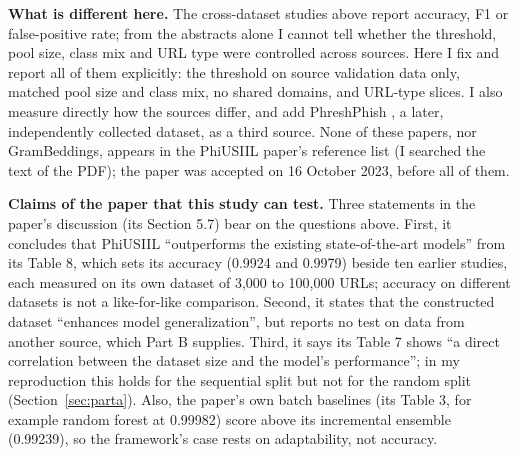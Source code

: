 \documentclass[10pt]{article}
\begin{document}
\textbf{What is different here.} The cross-dataset studies above report accuracy, F1 or false-positive rate; from the abstracts alone I cannot tell whether the threshold, pool size, class mix and URL type were controlled across sources. Here I fix and report all of them explicitly: the threshold on source validation data only, matched pool size and class mix, no shared domains, and URL-type slices. I also measure directly how the sources differ, and add PhreshPhish \cite{dalton2025}, a later, independently collected dataset, as a third source. None of these papers, nor GramBeddings, appears in the PhiUSIIL paper's reference list (I searched the text of the PDF); the paper was accepted on 16 October 2023, before all of them.

\textbf{Claims of the paper that this study can test.} Three statements in the paper's discussion (its Section 5.7) bear on the questions above. First, it concludes that PhiUSIIL ``outperforms the existing state-of-the-art models'' from its Table 8, which sets its accuracy (0.9924 and 0.9979) beside ten earlier studies, each measured on its own dataset of 3,000 to 100,000 URLs; accuracy on different datasets is not a like-for-like comparison. Second, it states that the constructed dataset ``enhances model generalization'', but reports no test on data from another source, which Part B supplies. Third, it says its Table 7 shows ``a direct correlation between the dataset size and the model's performance''; in my reproduction this holds for the sequential split but not for the random split (Section~\ref{sec:parta}). Also, the paper's own batch baselines (its Table 3, for example random forest at 0.99982) score above its incremental ensemble (0.99239), so the framework's case rests on adaptability, not accuracy.
\end{document}
